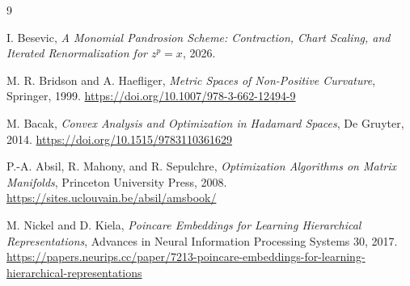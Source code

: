 \documentclass[10pt,a4paper]{article}
\theoremstyle{plain}
\theoremstyle{definition}
\theoremstyle{remark}
\begin{document}
\begin{thebibliography}{9}

I. Besevic,
\emph{A Monomial Pandrosion Scheme: Contraction, Chart Scaling, and Iterated
Renormalization for $z^p=x$}, 2026.

M. R. Bridson and A. Haefliger,
\emph{Metric Spaces of Non-Positive Curvature},
Springer, 1999.
\url{https://doi.org/10.1007/978-3-662-12494-9}

M. Bacak,
\emph{Convex Analysis and Optimization in Hadamard Spaces},
De Gruyter, 2014.
\url{https://doi.org/10.1515/9783110361629}

P.-A. Absil, R. Mahony, and R. Sepulchre,
\emph{Optimization Algorithms on Matrix Manifolds},
Princeton University Press, 2008.
\url{https://sites.uclouvain.be/absil/amsbook/}

M. Nickel and D. Kiela,
\emph{Poincare Embeddings for Learning Hierarchical Representations},
Advances in Neural Information Processing Systems 30, 2017.
\url{https://papers.neurips.cc/paper/7213-poincare-embeddings-for-learning-hierarchical-representations}

\end{thebibliography}
\end{document}
